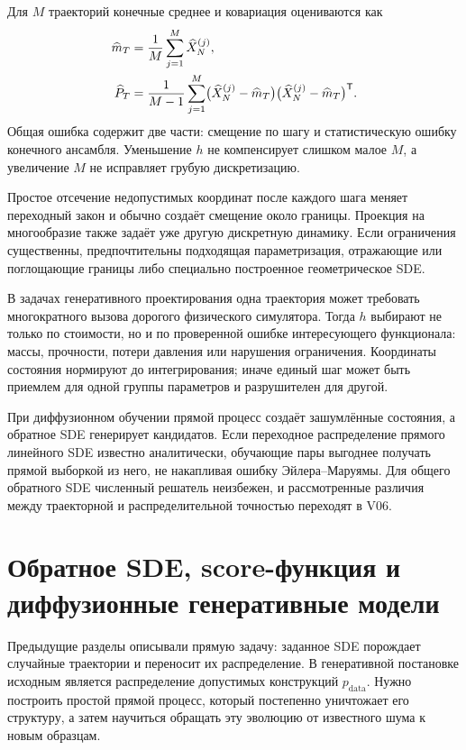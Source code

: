 Для $M$ траекторий конечные среднее и ковариация оцениваются как
\begin{align}
\label{eq:monte-carlo-mean-v05}
\widehat m_T
&=
\frac1M\sum_{j=1}^{M}\widehat X_N^{(j)},
\\
\label{eq:monte-carlo-covariance-v05}
\widehat P_T
&=
\frac1{M-1}
\sum_{j=1}^{M}
\bigl(\widehat X_N^{(j)}-\widehat m_T\bigr)
\bigl(\widehat X_N^{(j)}-\widehat m_T\bigr)^{\mathsf{T}}.
\end{align}
Общая ошибка содержит две части: смещение по шагу и статистическую ошибку конечного ансамбля. Уменьшение $h$ не компенсирует слишком малое $M$, а увеличение $M$ не исправляет грубую дискретизацию.

Простое отсечение недопустимых координат после каждого шага меняет переходный закон и обычно создаёт смещение около границы. Проекция на многообразие также задаёт уже другую дискретную динамику. Если ограничения существенны, предпочтительны подходящая параметризация, отражающие или поглощающие границы либо специально построенное геометрическое SDE.

В задачах генеративного проектирования одна траектория может требовать многократного вызова дорогого физического симулятора. Тогда $h$ выбирают не только по стоимости, но и по проверенной ошибке интересующего функционала: массы, прочности, потери давления или нарушения ограничения. Координаты состояния нормируют до интегрирования; иначе единый шаг может быть приемлем для одной группы параметров и разрушителен для другой.

При диффузионном обучении прямой процесс создаёт зашумлённые состояния, а обратное SDE генерирует кандидатов. Если переходное распределение прямого линейного SDE известно аналитически, обучающие пары выгоднее получать прямой выборкой из него, не накапливая ошибку Эйлера--Маруямы. Для общего обратного SDE численный решатель неизбежен, и рассмотренные различия между траекторной и распределительной точностью переходят в V06.

\section{Обратное SDE, score-функция и диффузионные генеративные модели}
\label{sec:reverse-sde-score-diffusion-models}

Предыдущие разделы описывали прямую задачу: заданное SDE порождает случайные траектории и переносит их распределение. В генеративной постановке исходным является распределение допустимых конструкций $p_{\mathrm{data}}$. Нужно построить простой прямой процесс, который постепенно уничтожает его структуру, а затем научиться обращать эту эволюцию от известного шума к новым образцам.


